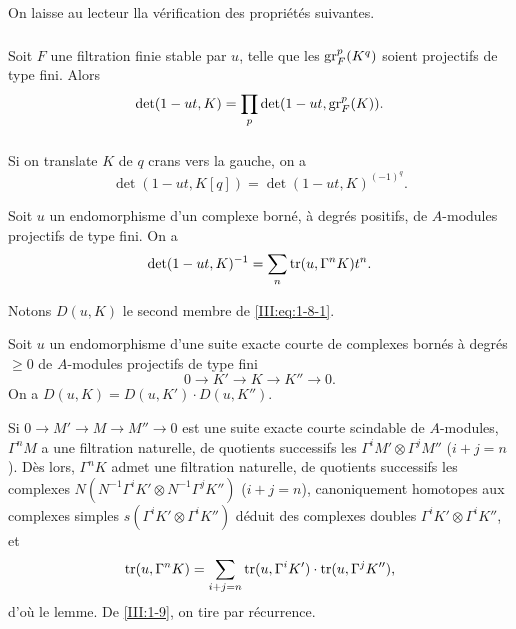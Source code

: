 \documentclass[oneside]{book}
\begin{document}
On laisse au lecteur lla v\'erification des propri\'et\'es suivantes. 


\subsubsection{}\label{III:1-7-1}

Soit $F$ une filtration finie stable par $u$, telle que les $\operatorname{gr}_F^p(K^q)$ 
soient projectifs de type fini. Alors 
\[
  \det(1-u t,K) = \prod_p \det(1-u t,\operatorname{gr}_F^p(K)) \text{.}
\]


\subsubsection{}\label{III:1-7-2}

Si on translate $K$ de $q$ crans vers la gauche, on a 
\[
  \det(1-u t,K[q]) = \det(1-u t,K)^{(-1)^q} \text{.}
\]





\begin{proposition_}\label{III:1-8}
Soit $u$ un endomorphisme d'un complexe born\'e, \`a degr\'es positifs, de 
$A$-modules projectifs de type fini. On a \
\begin{equation}\label{III:eq:1-8-1}
  \det(1-u t,K)^{-1} = \sum_n \operatorname{tr}(u,\Gamma^n K) t^n \text{.}
\end{equation}
\end{proposition_}

Notons $D(u,K)$ le second membre de \eqref{III:eq:1-8-1}. 





\begin{lemma_}\label{III:1-9}
Soit $u$ un endomorphisme d'une suite exacte courte de complexes born\'es \`a 
degr\'es $\geqslant 0$ de $A$-modules projectifs de type fini 
\[
  0 \to K' \to K \to K'' \to 0 \text{.}
\]
On a $D(u,K)=D(u,K')\cdot D(u,K'')$.
\end{lemma_}

Si $0\to M'\to M\to M''\to 0$ est une suite exacte courte scindable de 
$A$-modules, $\Gamma^n M$ a une filtration naturelle, de quotients successifs 
les $\Gamma^i M'\otimes \Gamma^j M''$ ($i+j=n$). D\`es lors, $\Gamma^n K$ admet 
une filtration naturelle, de quotients successifs les complexes 
$N(N^{-1} \Gamma^i K'\otimes N^{-1}\Gamma^j K'')$ ($i+j=n$), canoniquement 
homotopes aux complexes simples $s(\Gamma^i K'\otimes \Gamma^i K'')$ d\'eduit 
des complexes doubles $\Gamma^i K'\otimes \Gamma^i K''$, et 
\[
  \operatorname{tr}(u,\Gamma^n K) = \sum_{i+j=n} \operatorname{tr}(u,\Gamma^i K')\cdot \operatorname{tr}(u,\Gamma^j K'') \text{,}
\]
d'o\`u le lemme. De \ref{III:1-9}, on tire par r\'ecurrence. 
\end{document}
